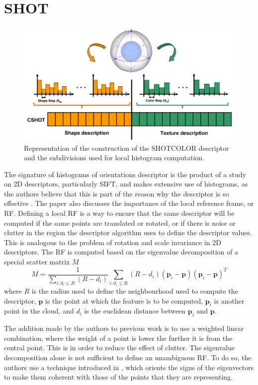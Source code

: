 \documentclass[11pt,a4paper]{kth-mag}
\begin{document}
\section{SHOT}
\begin{figure}
  \centering
  \includegraphics[width=\textwidth]{images/shotcolor}
  \caption{Representation of the construction of the SHOTCOLOR descriptor and
    the subdivisions used for local histogram computation.}
  \label{fig:shotcolor}
\end{figure}
The signature of histograms of orientations descriptor is the product of a study
on 2D descriptors, particularly SIFT, and makes extensive use of histograms, as
the authors believe that this is part of the reason why the descriptor is so
effective \cite{tombari2010unique}. The paper also discusses the importance of
the local reference frame, or RF. Defining a local RF is a way to ensure that
the same descriptor will be computed if the same points are translated or
rotated, or if there is noise or clutter in the region the descriptor algorithm
uses to define the descriptor values. This is analogous to the problem of
rotation and scale invariance in 2D descriptors. The RF is computed based on the
eigenvalue decomposition of a special scatter matrix $M$
\begin{equation}
  \label{eq:12}
  M=\frac{1}{\sum_{i:d_i\leq R}(R-d_i)}\sum_{i:d_i\leq R}(R-d_i)(\mathbf{p}_i-\mathbf{p})(\mathbf{p}_i-\mathbf{p})^T
\end{equation}
where $R$ is the radius used to define the neighbourhood used to compute the
descriptor, $\mathbf{p}$ is the point at which the feature is to be computed,
$\mathbf{p}_i$ is another point in the cloud, and $d_i$ is the euclidean
distance between $\mathbf{p}_i$ and $\mathbf{p}$.

The addition made by the authors to previous work is to use a weighted linear
combination, where the weight of a point is lower the further it is from the
central point. This is in order to reduce the effect of clutter. The eigenvalue
decomposition alone is not sufficient to define an unambiguous RF. To do so, the
authors use a technique introduced in \cite{bro2008resolving}, which orients the
signs of the eigenvectors to make them coherent with those of the points that
they are representing.
\end{document}
